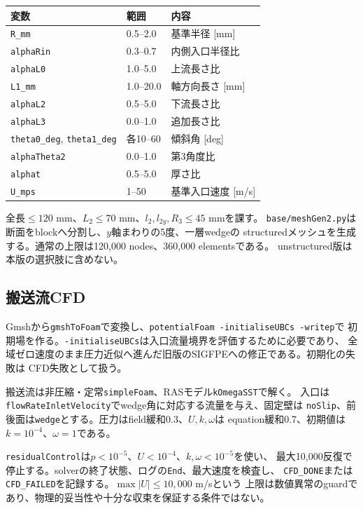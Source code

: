 \documentclass[a4paper,11pt]{article}
\newcommand{\code}[1]{\texttt{#1}}
\begin{document}
\begin{center}
\begin{tabular}{lll}
\toprule
変数 & 範囲 & 内容 \\
\midrule
\code{R\_mm} & 0.5--2.0 & 基準半径 [mm] \\
\code{alphaRin} & 0.3--0.7 & 内側入口半径比 \\
\code{alphaL0} & 1.0--5.0 & 上流長さ比 \\
\code{L1\_mm} & 1.0--20.0 & 軸方向長さ [mm] \\
\code{alphaL2} & 0.5--5.0 & 下流長さ比 \\
\code{alphaL3} & 0.0--1.0 & 追加長さ比 \\
\code{theta0\_deg}, \code{theta1\_deg} & 各10--60 & 傾斜角 [deg] \\
\code{alphaTheta2} & 0.0--1.0 & 第3角度比 \\
\code{alphat} & 0.5--5.0 & 厚さ比 \\
\code{U\_mps} & 1--50 & 基準入口速度 [m/s] \\
\bottomrule
\end{tabular}
\end{center}

全長$\leq120$ mm、$L_2\leq70$ mm、$l_2,l_{2y},R_3\leq45$ mmを課す。
\code{base/meshGen2.py}は断面をblockへ分割し、$y$軸まわりの5度、一層wedgeの
structuredメッシュを生成する。通常の上限は120,000 nodes、360,000 elementsである。
unstructured版は本版の選択肢に含めない。

\subsection{搬送流CFD}

Gmshから\code{gmshToFoam}で変換し、\code{potentialFoam -initialiseUBCs -writep}で
初期場を作る。\code{-initialiseUBCs}は入口流量境界を評価するために必要であり、
全域ゼロ速度のまま圧力近似へ進んだ旧版のSIGFPEへの修正である。初期化の失敗は
CFD失敗として扱う。

搬送流は非圧縮・定常\code{simpleFoam}、RASモデル\code{kOmegaSST}で解く。
入口は\code{flowRateInletVelocity}でwedge角に対応する流量を与え、固定壁は
\code{noSlip}、前後面は\code{wedge}とする。圧力はfield緩和0.3、$U,k,\omega$は
equation緩和0.7、初期値は$k=10^{-4}$、$\omega=1$である。

\code{residualControl}は$p<10^{-5}$、$U<10^{-4}$、$k,\omega<10^{-5}$を使い、
最大10,000反復で停止する。solverの終了状態、ログの\code{End}、最大速度を検査し、
\code{CFD\_DONE}または\code{CFD\_FAILED}を記録する。$\max|U|\leq10{,}000$ m/sという
上限は数値異常のguardであり、物理的妥当性や十分な収束を保証する条件ではない。
\end{document}
